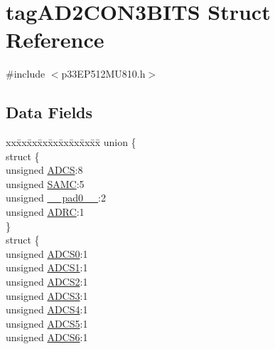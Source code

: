 \hypertarget{structtag_a_d2_c_o_n3_b_i_t_s}{}\section{tag\+A\+D2\+C\+O\+N3\+B\+I\+TS Struct Reference}
\label{structtag_a_d2_c_o_n3_b_i_t_s}


{\ttfamily \#include $<$p33\+E\+P512\+M\+U810.\+h$>$}

\subsection*{Data Fields}
\begin{DoxyCompactItemize}
\item 
\begin{tabbing}
xx\=xx\=xx\=xx\=xx\=xx\=xx\=xx\=xx\=\kill
union \{\\
\>struct \{\\
\>\>unsigned \hyperlink{structtag_a_d2_c_o_n3_b_i_t_s_a4726de302d42ce16fa478d46fa8b6547}{ADCS}:8\\
\>\>unsigned \hyperlink{structtag_a_d2_c_o_n3_b_i_t_s_a477fc5f81b5e1b617bfbf968c4402757}{SAMC}:5\\
\>\>unsigned \hyperlink{structtag_a_d2_c_o_n3_b_i_t_s_adf71f3d8410c1f1dbbc96680a92c49af}{\_\_pad0\_\_}:2\\
\>\>unsigned \hyperlink{structtag_a_d2_c_o_n3_b_i_t_s_a6829bc4287826c078b110f344d4585d4}{ADRC}:1\\
\>\} \\
\>struct \{\\
\>\>unsigned \hyperlink{structtag_a_d2_c_o_n3_b_i_t_s_afe527872723545abd9d6f12c56dfa7e7}{ADCS0}:1\\
\>\>unsigned \hyperlink{structtag_a_d2_c_o_n3_b_i_t_s_a8cf866f394fc998e3e6090d469196a67}{ADCS1}:1\\
\>\>unsigned \hyperlink{structtag_a_d2_c_o_n3_b_i_t_s_a325d1ff20bb28b63be0138eec6f5d58e}{ADCS2}:1\\
\>\>unsigned \hyperlink{structtag_a_d2_c_o_n3_b_i_t_s_a47049be7030de77b38edb565c1c28637}{ADCS3}:1\\
\>\>unsigned \hyperlink{structtag_a_d2_c_o_n3_b_i_t_s_a1d7c7c90f634a5b04060a45132223093}{ADCS4}:1\\
\>\>unsigned \hyperlink{structtag_a_d2_c_o_n3_b_i_t_s_a9ce7c5e43becc2e9902b34e7c68b5675}{ADCS5}:1\\
\>\>unsigned \hyperlink{structtag_a_d2_c_o_n3_b_i_t_s_afcd8237d69032806a10f8e02cee42508}{ADCS6}:1\\

\end{tabbing}
\end{DoxyCompactItemize}
